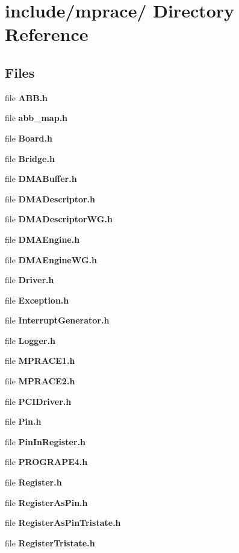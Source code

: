 \hypertarget{dir_000001}{
\section{include/mprace/ Directory Reference}
\label{dir_000001}
}
\subsection*{Files}
\begin{CompactItemize}
\item 
file {\bf ABB.h}
\item 
file {\bf abb_map.h}
\item 
file {\bf Board.h}
\item 
file {\bf Bridge.h}
\item 
file {\bf DMABuffer.h}
\item 
file {\bf DMADescriptor.h}
\item 
file {\bf DMADescriptorWG.h}
\item 
file {\bf DMAEngine.h}
\item 
file {\bf DMAEngineWG.h}
\item 
file {\bf Driver.h}
\item 
file {\bf Exception.h}
\item 
file {\bf InterruptGenerator.h}
\item 
file {\bf Logger.h}
\item 
file {\bf MPRACE1.h}
\item 
file {\bf MPRACE2.h}
\item 
file {\bf PCIDriver.h}
\item 
file {\bf Pin.h}
\item 
file {\bf PinInRegister.h}
\item 
file {\bf PROGRAPE4.h}
\item 
file {\bf Register.h}
\item 
file {\bf RegisterAsPin.h}
\item 
file {\bf RegisterAsPinTristate.h}
\item 
file {\bf RegisterTristate.h}
\end{CompactItemize}
